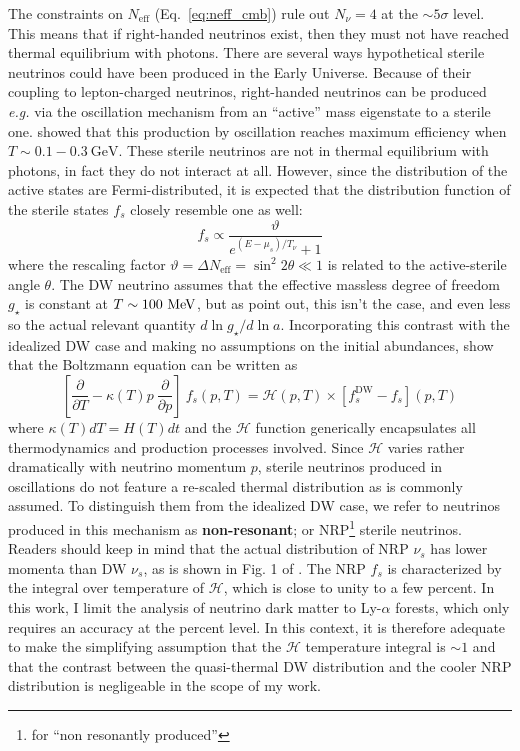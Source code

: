 The constraints on $N_{\mathrm{eff}}$ (Eq.~\ref{eq:neff_cmb}) rule out $N_\nu = 4$ at the $\sim 5\sigma$ level. This means that if right-handed neutrinos exist, then they must not have reached thermal equilibrium with photons. There are several ways hypothetical sterile neutrinos could have been produced in the Early Universe. Because of their coupling to lepton-charged neutrinos, right-handed neutrinos can be produced \textit{e.g.} via the oscillation mechanism from an ``active'' mass eigenstate to a sterile one. \cite{DodelsonWidrow94} showed that this production by oscillation reaches maximum efficiency when $T \sim 0.1-0.3~\mathrm{GeV}$. These sterile neutrinos are not in thermal equilibrium with photons, in fact they do not interact at all. However, since the distribution of the active states are Fermi-distributed, it is expected that the distribution function of the sterile states $f_s$ closely resemble one as well:
\begin{equation}
\label{eq:fs}
f_{s} \propto \frac{\vartheta}{e^{(E-\mu_s)/T_\nu}+1}
\end{equation} where the rescaling factor $\vartheta = \Delta N_{\mathrm{eff}} = \sin^2 2 \theta \ll 1$ is related to the active-sterile angle $\theta$. The DW neutrino assumes that the effective massless degree of freedom $g_\star$ is constant at $T \sim 100~\rm{MeV}$, but as \cite{Abazajian2016} point out, this isn't the case, and even less so the actual relevant quantity  $d \ln g_\star / d \ln a$. Incorporating this contrast with the idealized DW case and making no assumptions on the initial abundances, \cite{Merle_DW} show that the Boltzmann equation can be written as
\begin{equation}
	\left[ \frac{\partial}{\partial T} - \kappa(T) p~ \frac{\partial}{\partial p} \right]~ f_s (p, T) = \mathcal{H}(p,T) \times \left[ f^{\mathrm{DW}}_s - f_s \right](p,T)
		\label{eq:Merle}
\end{equation} where $\kappa(T)dT = H(T)dt$ and the $\mathcal{H}$ function generically encapsulates all thermodynamics and production processes involved. Since $\mathcal{H}$ varies rather dramatically with neutrino momentum $p$, sterile neutrinos produced in oscillations do not feature a re-scaled thermal distribution as is commonly assumed. To distinguish them from the idealized DW case, we refer to neutrinos produced in this mechanism as \textbf{non-resonant}; or NRP\footnote{for ``non resonantly produced''} sterile neutrinos. Readers should keep in mind that the actual distribution of NRP $\nu_s$ has lower momenta than DW $\nu_s$, as is shown in Fig. 1 of \cite{Merle_DW}. The NRP $f_s$ is characterized by the integral over temperature of $\mathcal{H}$, which is close to unity to a few percent. In this work, I limit the analysis of neutrino dark matter to Ly-$\alpha$ forests, which only requires an accuracy at the percent level. In this context, it is therefore adequate to make the simplifying assumption that the $\mathcal{H}$ temperature integral is $\sim 1$ and that the contrast between the quasi-thermal DW distribution and the cooler NRP distribution is negligeable in the scope of my work.  \\

